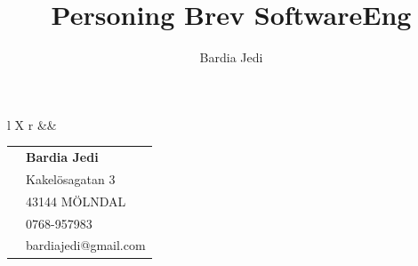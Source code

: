 \documentclass[12pt,a4paper]{article}
\author{Bardia Jedi}
\title{Personing Brev SoftwareEng}
\begin{document}
	
	
	\begin{tabularx}{ \textwidth}{ l X r  }				
  		 			&& 
  			\begin{tabular}{ r  l }
					& \textbf{Bardia Jedi}\\
					& Kakelösagatan 3\\
					& 43144 MÖLNDAL\\			
  					& 0768-957983\\
  					& bardiajedi@gmail.com \\
 
			\end{tabular}\\
	\end{tabularx}
	\vspace{12pt}
\end{document}
